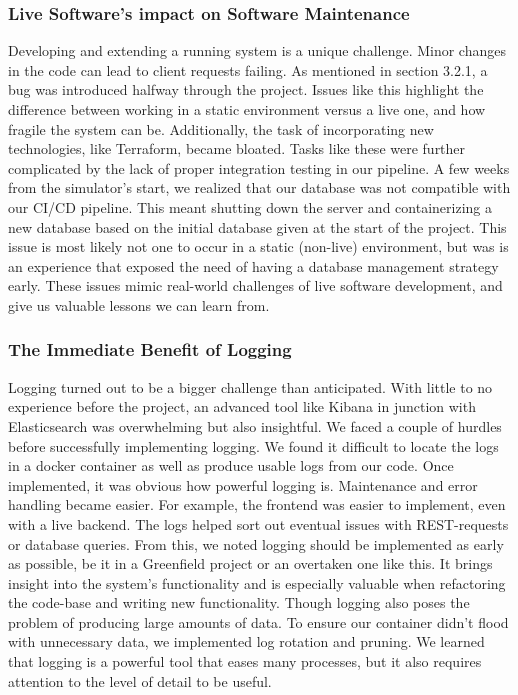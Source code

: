 \subsubsection{Live Software's impact on Software Maintenance}
Developing and extending a running system is a unique challenge. Minor changes in the code can lead to client requests failing. As mentioned in section 3.2.1, a bug was introduced halfway through the project. Issues like this highlight the difference between working in a static environment versus a live one, and how fragile the system can be. 
Additionally, the task of incorporating new technologies, like Terraform, became bloated. Tasks like these were further complicated by the lack of proper integration testing in our pipeline.
A few weeks from the simulator's start, we realized that our database was not compatible with our CI/CD pipeline. This meant shutting down the server and containerizing a new database based on the initial database given at the start of the project. This issue is most likely not one to occur in a static (non-live) environment, but was is an experience that exposed the need of having a database management strategy early.
These issues mimic real-world challenges of live software development, and give us valuable lessons we can learn from.


\subsubsection{The Immediate Benefit of Logging}
Logging turned out to be a bigger challenge than anticipated.
With little to no experience before the project, an advanced tool like Kibana in junction with Elasticsearch was overwhelming but also insightful.
We faced a couple of hurdles before successfully implementing logging.
We found it difficult to locate the logs in a docker container as well as produce usable logs from our code.
Once implemented, it was obvious how powerful logging is.
Maintenance and error handling became easier.
For example, the frontend was easier to implement, even with a live backend.
The logs helped sort out eventual issues with REST-requests or database queries.
From this, we noted logging should be implemented as early as possible, be it in a Greenfield project or an overtaken one like this.
It brings insight into the system's functionality and is especially valuable when refactoring the code-base and writing new functionality.
Though logging also poses the problem of producing large amounts of data.
To ensure our container didn't flood with unnecessary data, we implemented log rotation and pruning.
We learned that logging is a powerful tool that eases many processes, but it also requires attention to the level of detail to be useful.


